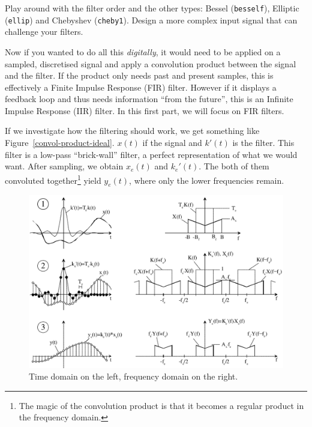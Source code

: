\documentclass{../template/labo}
\begin{document}
\begin{leftbar}
Play around with the filter order and the other types: Bessel (\texttt{besself}), Elliptic (\texttt{ellip}) and Chebyshev (\texttt{cheby1}).
Design a more complex input signal that can challenge your filters.
\end{leftbar}




Now if you wanted to do all this \textit{digitally}, it would need to be applied on a sampled, discretised signal and apply a convolution product between the signal and the filter.
If the product only needs past and present samples, this is effectively a Finite Impulse Response (FIR) filter. However if it displays a feedback loop and thus needs information ``from the future'', this is an Infinite Impulse Response (IIR) filter.
In this first part, we will focus on FIR filters.

If we investigate how the filtering should work, we get something like Figure~\ref{convol-product-ideal}.
$x(t)$ if the signal and $k'(t)$ is the filter.
This filter is a low-pass ``brick-wall'' filter, a perfect representation of what we would want.
After sampling, we obtain $x_e(t)$ and $k_e'(t)$. The both of them convoluted together\footnote{The magic of the convolution product is that it becomes a regular product in the frequency domain.} yield $y_e(t)$, where only the lower frequencies remain.

\begin{figure}[ht!]
\centering
\includegraphics[width=\textwidth]{convol-product-ideal.png}
\caption{Time domain on the left, frequency domain on the right.}
\label{fig:convol-product-ideal}
\end{figure}
\end{document}
